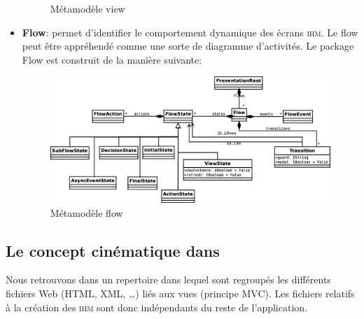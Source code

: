 \begin{itemize}
\begin{figure}[H]
  \caption{Métamodèle view}
  \label{fig:Métamodèle View}
\end{figure}
  \item \textbf{Flow}: permet d'identifier le comportement dynamique des écrans \textsc{ihm}. Le flow peut être appréhendé comme une sorte de diagramme d'activités.
\newline
Le package Flow est construit de la manière suivante:
\newline
\begin{figure}[H]
  \centering
  \includegraphics[scale=.3]{img/flow.eps}
  \caption{Métamodèle flow}
  \label{fig:Métamodèle Flow}
\end{figure}
\end{itemize}
\subsection{Le concept cinématique dans \kwplay{}}
Nous retrouvons dans \kwplay{} un repertoire dans lequel sont regroupés les différents fichiers Web (HTML, XML, …) liés aux vues (principe MVC). Les fichiers relatifs à la création des \textsc{ihm} sont donc indépendants du reste de l'application.   
